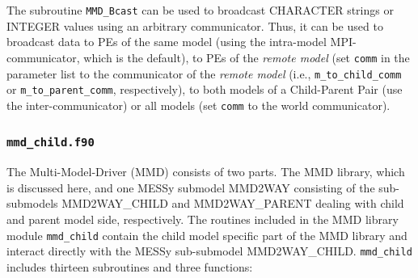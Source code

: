 \documentclass[twoside]{article}
\begin{document}
\begin{itemize}
The subroutine \verb|MMD_Bcast| can be used to broadcast 
{\footnotesize CHARACTER}
strings or {\footnotesize INTEGER} values using an arbitrary communicator. 
Thus, it can be used to broadcast data to PEs of the same model (using the
intra-model MPI-communicator, which is the default),
 to PEs of the {\it remote model} (set \verb|comm| in the parameter list to the 
communicator of the {\it remote model} (i.e., \verb|m_to_child_comm| or
\verb|m_to_parent_comm|, respectively), to both models of a Child-Parent Pair
(use the inter-communicator) or all models 
(set \verb|comm| to the world communicator).\\

\end{itemize}

\subsubsection{{\tt mmd\_child.f90}}\label{sec:mmd-child}
The Multi-Model-Driver (MMD) consists of two parts. The MMD library, which
is discussed here, and one MESSy submodel MMD2WAY consisting of the
sub-submodels MMD2WAY\_CHILD  and MMD2WAY\_PARENT dealing with child and
parent model side, respectively. The routines included in the MMD library module
\verb|mmd_child| contain the child model specific part of the MMD library and  
interact directly with the MESSy sub-submodel MMD2WAY\_CHILD.
\verb|mmd_child| includes thirteen subroutines and three functions:
\end{document}
